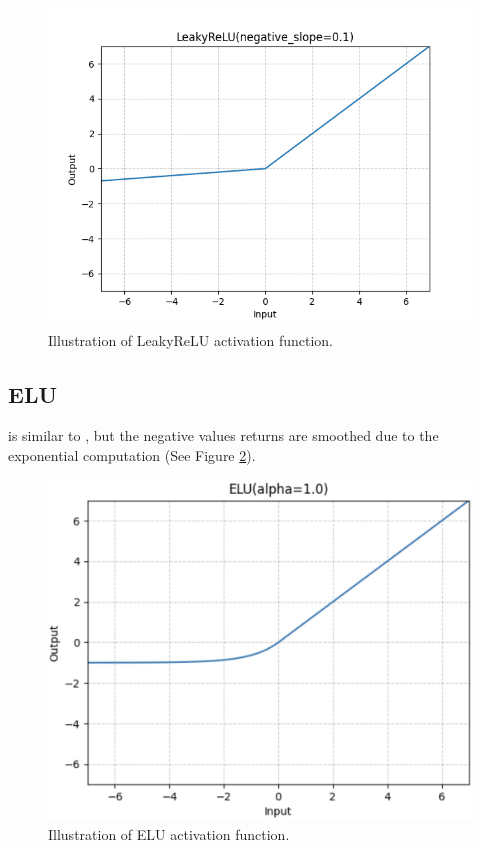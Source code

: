     \begin{figure}[H]
		\centering
		\includegraphics[scale=0.5]{img/leaky-relu.png}
		\caption{Illustration of LeakyReLU activation function.}
		\label{leaky-relu}
	\end{figure}

\subsection{ELU}
\indent
     is similar to , but the negative values returns are smoothed due to the exponential computation (See Figure \ref{elu}).

    \begin{figure}[H]
		\centering
		\includegraphics[scale=0.3]{img/elu.png}
		\caption{Illustration of ELU activation function.}
		\label{elu}
	\end{figure}
